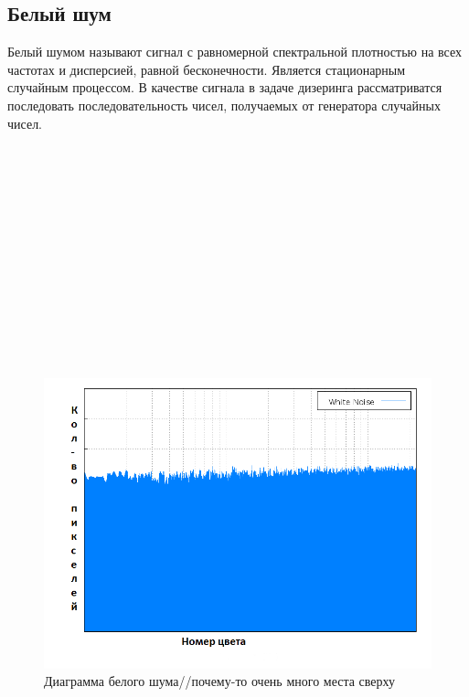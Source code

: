 \subsection{Белый шум}
Белый шумом называют сигнал с равномерной спектральной плотностью на всех частотах и дисперсией, равной бесконечности. Является стационарным случайным процессом.
В качестве сигнала в задаче дизеринга  рассматриватся последовать последовательность чисел, получаемых от генератора случайных чисел.
\\\\\\\\\\\\\\\\\\\\\\\\\\\
\begin{figure}[h!]
	\centering
	\includegraphics[width=\textwidth]{img/8_white_noise.png}
	\caption{Диаграмма белого шума//почему-то очень много места сверху}
	\label{fig:spire05}
\end{figure}

